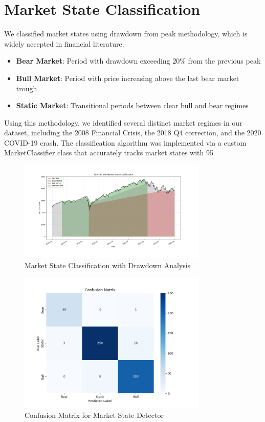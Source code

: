 \documentclass[10pt]{article}
\begin{document}
\section{Market State Classification}
We classified market states using drawdown from peak methodology, which is widely accepted in financial literature:
\begin{itemize}
	\item \textbf{Bear Market}: Period with drawdown exceeding 20\% from the previous peak
	\item \textbf{Bull Market}: Period with price increasing above the last bear market trough
	\item \textbf{Static Market}: Transitional periods between clear bull and bear regimes
\end{itemize}
Using this methodology, we identified several distinct market regimes in our dataset, including the 2008 Financial Crisis, the 2018 Q4 correction, and the 2020 COVID-19 crash. The classification algorithm was implemented via a custom MarketClassifier class that accurately tracks market states with 95%

\begin{figure}[htbp]
	\centering
	\includegraphics[width=0.8\textwidth]{../results/market_states.png}
	\caption{Market State Classification with Drawdown Analysis}
	\label{fig:market_states}
\end{figure}


\begin{figure}[htbp]
	\centering
	\includegraphics[width=0.8\textwidth]{../results/confusion_matrix.png}
	\caption{Confusion Matrix for Market State Detector}
	\label{fig:confusion_matrix}
\end{figure}
\end{document}
